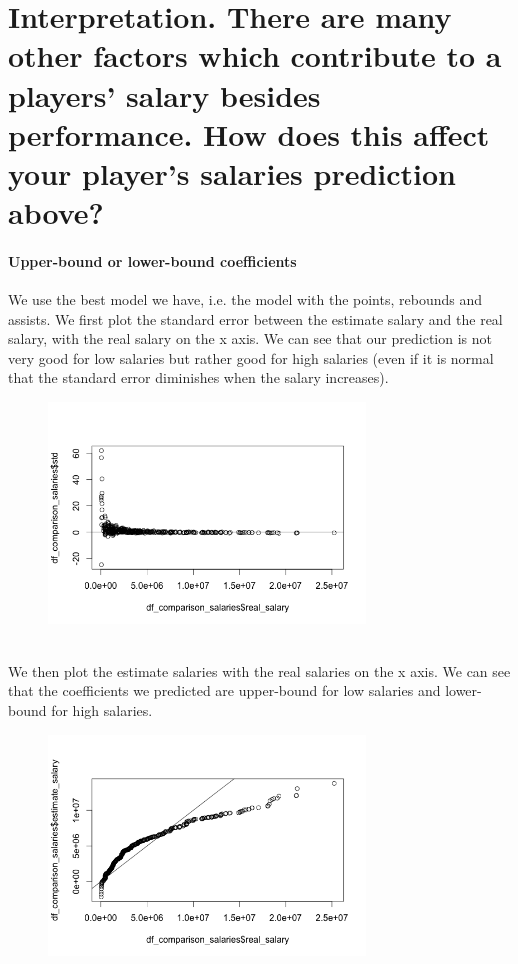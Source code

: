 
\section*{Interpretation. There are many other factors which contribute to a players’ salary besides performance. How does this affect your player’s salaries prediction above?}
\label{subsec:3Q4}

\paragraph{Upper-bound or lower-bound coefficients}We use the best model we have, i.e. the model with the points, rebounds and assists. 
We first plot the standard error between the estimate salary and the real salary, with the real salary on the x axis. We can see that our prediction is not very good for low salaries but rather good for high salaries (even if it is normal that the standard error diminishes when the salary increases).
\begin{figure}[h!]
\centering
\includegraphics[width=0.75\textwidth]{images/Std_error}
\end{figure}
\\
We then plot the estimate salaries with the real salaries on the x axis. We can see that the coefficients we predicted are upper-bound for low salaries and lower-bound for high salaries.
\begin{figure}[h!]
\centering
\includegraphics[width=0.75\textwidth]{images/Estimate_salaries}
\end{figure}

